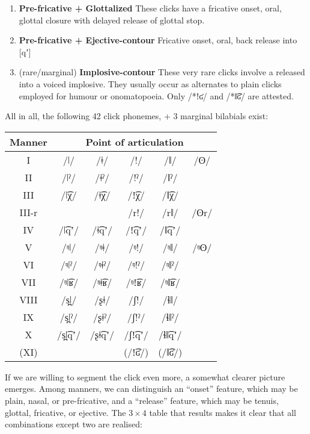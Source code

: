 \documentclass[11pt,a5paper]{book}
\begin{document}
\begin{enumerate}[I]
\item \textbf{Pre-fricative + Glottalized} These clicks have a fricative onset, oral, glottal closure with delayed release of glottal stop.
\item \textbf{Pre-fricative + Ejective-contour} Fricative onset, oral, back release into [qʼ]
\item (rare/marginal) \textbf{Implosive-contour} These very rare clicks involve a released into a voiced implosive. They usually occur as alternates to plain clicks employed for humour or onomatopoeia. Only /*ǃʛ/ and /*‖͡ʛ/ are attested.
\end{enumerate}

All in all, the following 42 click phonemes, + 3 marginal bilabials exist:


\begin{center}

\begin{tabular}{|c|c|c|c|c|c|}
\hline Manner & \multicolumn{5}{c|}{Point of articulation} \\ \hline\hline
I &  	/ǀ/ &	/ǂ/ &	/!/ &	/ǁ/  & /ʘ/\\ \hline
II &  	/ǀˀ/ &	/ǂˀ/ &	/!ˀ/ &	/ǁˀ/ & \\ \hline
III &  	/ǀ͡χ/ &	/ǂ͡χ/ &	/!͡χ/ &	/ǁ͡χ/ &\\ \hline
III-r &      &           & /r!/ &  /rǁ/ & /ʘr/ \\ \hline
IV &  	/ǀ͡qʼ/ &	/ǂ͡qʼ/ &	/!͡qʼ/ &	/ǁ͡qʼ/& \\ \hline
V &  	/ᵑǀ/ &	/ᵑǂ/ &	/ᵑ!/ &	/ᵑǁ/  &  /ᵑʘ/\\ \hline
VI &  	/ᵑǀˀ/ &	/ᵑǂˀ/ &	/ᵑ!ˀ/ &	/ᵑǁˀ/ &\\ \hline
VII &  	/ᵑǀ͡ʁ/ &	/ᵑǂ͡ʁ/ &	/ᵑ!͡ʁ/ &	/ᵑǁ͡ʁ/ &\\ \hline
VIII &  	/s̪ǀ/ &	/ʂǂ/ &	/ʃ!/ &	/ɬǁ/ &\\ \hline
IX &  	/s̪ǀˀ/ &	/ʂǂˀ/ &	/ʃ!ˀ/ &	/ɬǁˀ/ &\\ \hline
X & /s̪ǀ͡qʼ/ &	/ʂǂ͡qʼ/ &	/ʃ!͡qʼ/ &	/ɬǁ͡qʼ/& \\ \hline
(XI) & & & (/ǃ͡ʛ/) &  (/‖͡ʛ/) & \\ \hline
\end{tabular}

\end{center}

If we are willing to segment the click even more, a somewhat clearer picture emerges. Among manners, we can distinguish an ``onset'' feature, which may be plain, nasal, or pre-fricative, and a ``release'' feature, which may be tenuis, glottal, fricative, or ejective. The $3\times 4$ table that results makes it clear that all combinations except two are realised:
\end{document}
